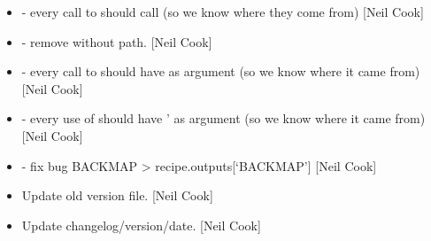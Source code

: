 \documentclass[a4paper,10pt,english]{report}
\begin{document}
\begin{itemize}
\item {} 
 - every call to  should call  (so
we know where they come from) {[}Neil Cook{]}

\item {} 
 - remove  without path. {[}Neil Cook{]}

\item {} 
 - every call to  should
have  as argument (so we know where it came from) {[}Neil Cook{]}

\item {} 
 - every use of 
should have ’ as argument (so we know where it came from)
{[}Neil Cook{]}

\item {} 
 - fix bug BACKMAP \textendash{}\textgreater{}
recipe.outputs{[}‘BACKMAP’{]} {[}Neil Cook{]}

\item {} 
Update old version file. {[}Neil Cook{]}

\item {} 
Update changelog/version/date. {[}Neil Cook{]}

\end{itemize}
\end{document}
